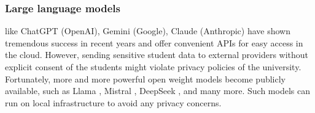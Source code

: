 \subsubsection{Large language models} like ChatGPT (OpenAI), Gemini (Google), Claude (Anthropic) have shown tremendous success in recent years and offer convenient APIs for easy access in the cloud. However, sending sensitive student data to external providers without explicit consent of the students might violate privacy policies of the university. 
Fortunately, more and more powerful open weight models become publicly available, such as Llama \cite{touvron2023llama_1,touvron2023llama_2,dubey2024llama3herdmodels}, Mistral \cite{jiang2023mistral7b,mistralnemoblog,mistrallarge}, %
DeepSeek \cite{deepseekai2025}, and many more. Such models can run on local infrastructure to avoid any privacy concerns.







